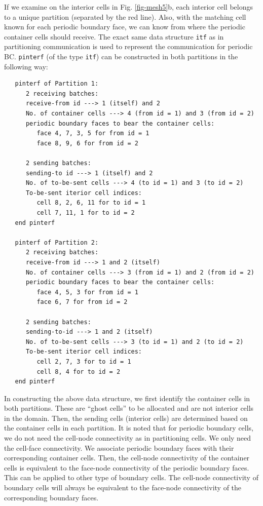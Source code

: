 \documentclass[12pt, letterpaper]{report}
\begin{document}
If we examine on the interior cells in Fig. \ref{fig-mesh5}b, each interior cell belongs to a
unique partition (separated by the red line). Also, with the matching cell known for each
periodic boundary face, we can know from where the periodic container cells should receive.
The exact same data structure \verb+itf+ as in partitioning communication is used to represent
the communication for periodic BC. \verb+pinterf+ (of the type \verb+itf+) can be constructed in both
partitions in the following way:

\begin{verbatim}
   pinterf of Partition 1:
      2 receiving batches:
      receive-from id ---> 1 (itself) and 2
      No. of container cells ---> 4 (from id = 1) and 3 (from id = 2)
      periodic boundary faces to bear the container cells:
         face 4, 7, 3, 5 for from id = 1
         face 8, 9, 6 for from id = 2

      2 sending batches:
      sending-to id ---> 1 (itself) and 2
      No. of to-be-sent cells ---> 4 (to id = 1) and 3 (to id = 2)
      To-be-sent iterior cell indices:
         cell 8, 2, 6, 11 for to id = 1
         cell 7, 11, 1 for to id = 2
   end pinterf

   pinterf of Partition 2:
      2 receiving batches:
      receive-from id ---> 1 and 2 (itself)
      No. of container cells ---> 3 (from id = 1) and 2 (from id = 2)
      periodic boundary faces to bear the container cells:
         face 4, 5, 3 for from id = 1
         face 6, 7 for from id = 2

      2 sending batches:
      sending-to-id ---> 1 and 2 (itself)
      No. of to-be-sent cells ---> 3 (to id = 1) and 2 (to id = 2)
      To-be-sent iterior cell indices:
         cell 2, 7, 3 for to id = 1
         cell 8, 4 for to id = 2
   end pinterf
\end{verbatim}

In constructing the above data structure, we first identify the container cells in both partitions.
These are ``ghost cells'' to be allocated and are not interior cells in the domain. Then, the
sending cells (interior cells) are determined based on the container cells in each partition. It is
noted that for periodic boundary cells, we do not need the cell-node connectivity as in partitioning
cells. We only need the cell-face connectivity. We associate periodic boundary faces with their
corresponding container cells. Then, the cell-node connectivity of the container cells is equivalent
to the face-node connectivity of the periodic boundary faces. This can be applied to other type of
boundary cells. The cell-node connectivity of boundary cells will always be equivalent to the
face-node connectivity of the corresponding boundary faces.
\paraspace
\end{document}
